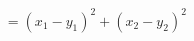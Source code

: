 \documentclass[preview]{standalone}
\begin{document}
\begin{align*}
=(x_{1}-y_{1})^2 + (x_{2}-y_{2})^2 \\ &
\end{align*}
\end{document}
